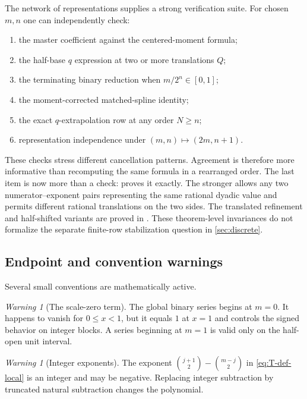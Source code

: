 \documentclass[11pt,oneside]{article}
\theoremstyle{definition}
\theoremstyle{remark}
\newtheorem{warning}[theorem]{Warning}
\begin{document}
The network of representations supplies a strong verification suite.  For chosen $m,n$ one
can independently check:
\begin{enumerate}
\item the master coefficient against the centered-moment formula;
\item the half-base $q$ expression at two or more translations $Q$;
\item the terminating binary reduction when $m/2^n\in[0,1]$;
\item the moment-corrected matched-spline identity;
\item the exact $q$-extrapolation row at any order $N\ge n$;
\item representation independence under $(m,n)\mapsto(2m,n+1)$.
\end{enumerate}
These checks stress different cancellation patterns.  Agreement is therefore more informative
than recomputing the same formula in a rearranged order.  The last item is now more than a
check:  proves it exactly.  The stronger
 allows any two
numerator--exponent pairs representing the same rational dyadic value and permits different
rational translations on the two sides.  The translated refinement and half-shifted variants
are proved in .  These theorem-level invariances do not
formalize the separate finite-row stabilization question in \cref{sec:discrete}.

\subsection{Endpoint and convention warnings}

Several small conventions are mathematically active.

\begin{warning}[The scale-zero term]
The global binary series begins at $m=0$.  It happens to vanish for $0\le x<1$, but it equals
$1$ at $x=1$ and controls the signed behavior on integer blocks.  A series beginning at
$m=1$ is valid only on the half-open unit interval.
\end{warning}

\begin{warning}[Integer exponents]
The exponent
$\binom{j+1}{2}-\binom{m-j}{2}$ in \eqref{eq:T-def-local} is an integer and may be negative.
Replacing integer subtraction by truncated natural subtraction changes the polynomial.
\end{warning}
\end{document}
